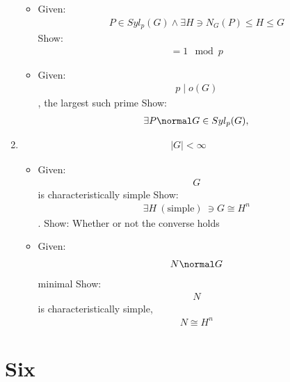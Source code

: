 \begin{enumerate}
  \begin{itemize}
  \tightlist
  \item
    Given:
    \begin{align*}P \in Syl_p(G) \wedge \exists H \ni N_G(P) \leq H \leq G\end{align*}
    Show: \begin{align*}[G:H] = 1 \mod p\end{align*}
  \item
    Given: \begin{align*}p \mid o(G)\end{align*}, the largest such prime
    Show: \begin{align*}\exists P \normal G \in Syl_p(G),\end{align*}
  \end{itemize}
\item
  \begin{align*}|G| < \infty\end{align*}

  \begin{itemize}
  \tightlist
  \item
    Given: \begin{align*}G\end{align*} is characteristically simple
    Show:
    \begin{align*}\exists H~(\text{simple})~ \ni G \cong H^n\end{align*}.
    Show: Whether or not the converse holds
  \item
    Given: \begin{align*}N \normal G\end{align*} minimal Show:
    \begin{align*}N\end{align*} is characteristically simple,
    \begin{align*}N \cong H^n\end{align*}
  \end{itemize}
\end{enumerate}

\hypertarget{six}{%
\section{Six}\label{six}}

